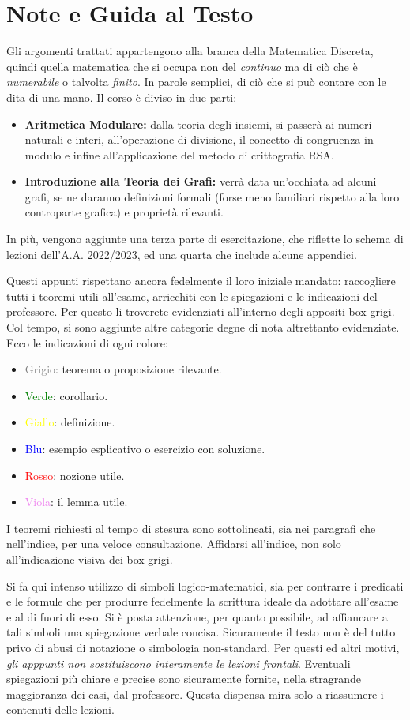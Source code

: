\chapter*{Note e Guida al Testo}
Gli argomenti trattati appartengono alla branca della Matematica Discreta,
quindi quella matematica che si occupa non del \textit{continuo} ma di
ciò che è \textit{numerabile} o talvolta \textit{finito}. In parole
semplici, di ciò che si può contare con le dita di una mano. Il corso
è diviso in due parti:
\begin{itemize}
\item \textbf{Aritmetica Modulare:} dalla teoria degli insiemi,
si passerà ai numeri naturali e interi, all'operazione di divisione,
il concetto di congruenza in modulo e infine all'applicazione
del metodo di crittografia RSA.

\item \textbf{Introduzione alla Teoria dei Grafi:} verrà data un'occhiata
ad alcuni grafi, se ne daranno definizioni formali (forse meno familiari
rispetto alla loro controparte grafica) e proprietà rilevanti.
\end{itemize}
In più, vengono aggiunte una terza parte di esercitazione, che riflette
lo schema di lezioni dell'A.A. 2022/2023, ed una quarta che include
alcune appendici.

Questi appunti rispettano ancora fedelmente il loro iniziale mandato:
raccogliere tutti i teoremi utili all'esame, arricchiti con le spiegazioni
e le indicazioni del professore. Per questo li troverete evidenziati
all'interno degli appositi box grigi. Col tempo, si sono aggiunte altre
categorie degne di nota altrettanto evidenziate. Ecco le indicazioni di ogni
colore:
\begin{itemize}
\item \textcolor{gray}{Grigio}: teorema o proposizione rilevante.
\item \textcolor{green}{Verde}: corollario.
\item \textcolor{yellow}{Giallo}: definizione.
\item \textcolor{blue}{Blu}: esempio esplicativo o esercizio con soluzione.
\item \textcolor{red}{Rosso}: nozione utile.
\item \textcolor{violet}{Viola}: il lemma utile.
\end{itemize}
I teoremi richiesti al tempo di stesura sono sottolineati, sia
nei paragrafi che nell'indice, per una veloce consultazione.
Affidarsi all'indice, non solo all'indicazione visiva dei box
grigi.

Si fa qui intenso utilizzo di simboli logico-matematici, sia per
contrarre i predicati e le formule che per produrre fedelmente la
scrittura ideale da adottare all'esame e al di fuori di esso. Si
è posta attenzione, per quanto possibile, ad affiancare a tali
simboli una spiegazione verbale concisa. Sicuramente il testo non
è del tutto privo di abusi di notazione o simbologia non-standard.
Per questi ed altri motivi, \textit{gli apppunti non sostituiscono
interamente le lezioni frontali}. Eventuali spiegazioni più chiare
e precise sono sicuramente fornite, nella stragrande maggioranza dei
casi, dal professore. Questa dispensa mira solo a riassumere i contenuti
delle lezioni.
